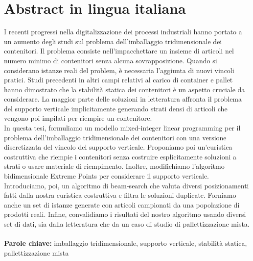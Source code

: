 
\chapter*{Abstract in lingua italiana}
I recenti progressi nella digitalizzazione dei processi industriali hanno portato a un aumento degli studi sul problema dell'imballaggio tridimensionale dei contenitori.
Il problema consiste nell'impacchettare un insieme di articoli nel numero minimo di contenitori senza alcuna sovrapposizione.
Quando si considerano istanze reali del problem, è necessaria l'aggiunta di nuovi vincoli pratici.
Studi precedenti in altri campi relativi al carico di container e pallet hanno dimostrato che la stabilità statica dei contenitori è un aspetto cruciale da considerare.
La maggior parte delle soluzioni in letteratura affronta il problema del supporto verticale implicitamente generando strati densi di articoli che vengono poi impilati per riempire un contenitore.
\\
In questa tesi, formuliamo un modello mixed-integer linear programming per il problema dell'imballaggio tridimensionale dei contenitori con una versione discretizzata del vincolo del supporto verticale.
Proponiamo poi un'euristica costruttiva che riempie i contenitori senza costruire esplicitamente soluzioni a strati o usare materiale di riempimento.
Inoltre, modifichiamo l'algoritmo bidimensionale Extreme Points per considerare il supporto verticale.
Introduciamo, poi, un algoritmo di beam-search che valuta diversi posizionamenti fatti dalla nostra euristica costruttiva e filtra le soluzioni duplicate.
Forniamo anche un set di istanze generate con articoli campionati da una popolazione di prodotti reali.
Infine, convalidiamo i risultati del nostro algoritmo usando diversi set di dati, sia dalla letteratura che da un caso di studio di pallettizzazione mista.
\\
\\
\textbf{Parole chiave:} imballaggio tridimensionale, supporto verticale, stabilità statica, pallettizzazione mista %